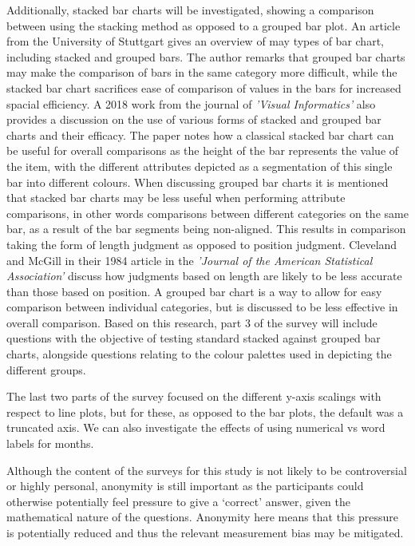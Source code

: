 \documentclass[
  12pt,
  twocolumn]{book}
\begin{document}
Additionally, stacked bar charts will be investigated, showing a
comparison between using the stacking method as opposed to a grouped bar
plot. An article from the University of Stuttgart
\citep{HuynhHaiDang2017} gives an overview of may types of bar chart,
including stacked and grouped bars. The author remarks that grouped bar
charts may make the comparison of bars in the same category more
difficult, while the stacked bar chart sacrifices ease of comparison of
values in the bars for increased spacial efficiency. A 2018 work from
the journal of \textit{'Visual Informatics'} \citep{INDRATMO2018155}
also provides a discussion on the use of various forms of stacked and
grouped bar charts and their efficacy. The paper notes how a classical
stacked bar chart can be useful for overall comparisons as the height of
the bar represents the value of the item, with the different attributes
depicted as a segmentation of this single bar into different colours.
When discussing grouped bar charts it is mentioned that stacked bar
charts may be less useful when performing attribute comparisons, in
other words comparisons between different categories on the same bar, as
a result of the bar segments being non-aligned. This results in
comparison taking the form of length judgment as opposed to position
judgment. Cleveland and McGill in their 1984 article in the
\textit{'Journal of the American Statistical Association'}
\citep{clevelandmcgill} discuss how judgments based on length are likely
to be less accurate than those based on position. A grouped bar chart is
a way to allow for easy comparison between individual categories, but is
discussed to be less effective in overall comparison. Based on this
research, part 3 of the survey will include questions with the objective
of testing standard stacked against grouped bar charts, alongside
questions relating to the colour palettes used in depicting the
different groups.

The last two parts of the survey focused on the different y-axis
scalings with respect to line plots, but for these, as opposed to the
bar plots, the default was a truncated axis. We can also investigate the
effects of using numerical vs word labels for months.

Although the content of the surveys for this study is not likely to be
controversial or highly personal, anonymity is still important as the
participants could otherwise potentially feel pressure to give a
`correct' answer, given the mathematical nature of the questions.
Anonymity here means that this pressure is potentially reduced and thus
the relevant measurement bias may be mitigated.
\end{document}
